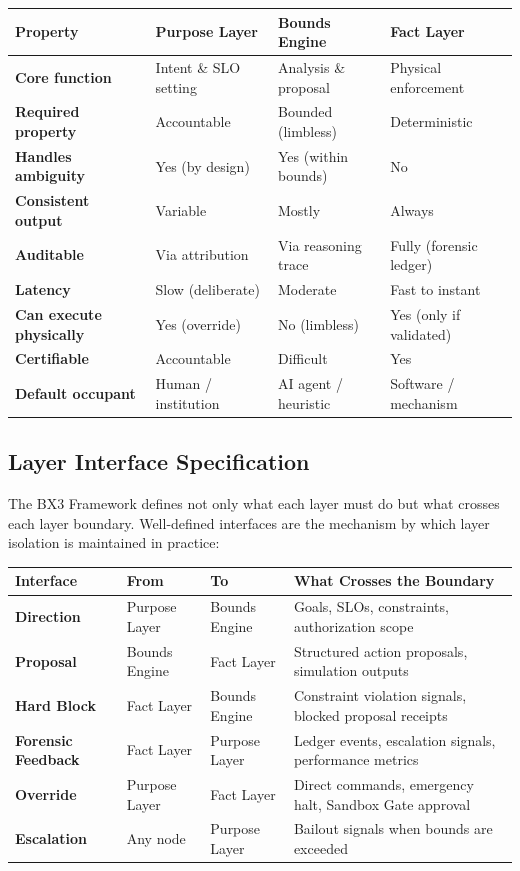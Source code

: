 \documentclass[12pt]{article}
\begin{document}
\begin{center}
\begin{tabular}{>{\bfseries}p{2.6cm} p{3.3cm} p{3.3cm} p{3.3cm}}
\toprule
\textbf{Property} & \textbf{Purpose Layer} & \textbf{Bounds Engine} & \textbf{Fact Layer} \\
\midrule
Core function & Intent \& SLO setting & Analysis \& proposal & Physical enforcement \\
\addlinespace
Required property & Accountable & Bounded (limbless) & Deterministic \\
\addlinespace
Handles ambiguity & Yes (by design) & Yes (within bounds) & No \\
\addlinespace
Consistent output & Variable & Mostly & Always \\
\addlinespace
Auditable & Via attribution & Via reasoning trace & Fully (forensic ledger) \\
\addlinespace
Latency & Slow (deliberate) & Moderate & Fast to instant \\
\addlinespace
Can execute physically & Yes (override) & No (limbless) & Yes (only if validated) \\
\addlinespace
Certifiable & Accountable & Difficult & Yes \\
\addlinespace
Default occupant & Human / institution & AI agent / heuristic & Software / mechanism \\
\bottomrule
\end{tabular}
\end{center}

\subsection{Layer Interface Specification}

The BX3 Framework defines not only what each layer must do but what crosses each layer boundary. Well-defined interfaces are the mechanism by which layer isolation is maintained in practice:

\begin{center}
\begin{tabular}{>{\bfseries}p{3cm} p{2.2cm} p{2.2cm} p{6cm}}
\toprule
\textbf{Interface} & \textbf{From} & \textbf{To} & \textbf{What Crosses the Boundary} \\
\midrule
Direction & Purpose Layer & Bounds Engine & Goals, SLOs, constraints, authorization scope \\
\addlinespace
Proposal & Bounds Engine & Fact Layer & Structured action proposals, simulation outputs \\
\addlinespace
Hard Block & Fact Layer & Bounds Engine & Constraint violation signals, blocked proposal receipts \\
\addlinespace
Forensic Feedback & Fact Layer & Purpose Layer & Ledger events, escalation signals, performance metrics \\
\addlinespace
Override & Purpose Layer & Fact Layer & Direct commands, emergency halt, Sandbox Gate approval \\
\addlinespace
Escalation & Any node & Purpose Layer & Bailout signals when bounds are exceeded \\
\bottomrule
\end{tabular}
\end{center}
\end{document}
